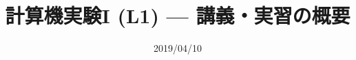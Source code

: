 \documentclass[dvipdfmx]{beamer}
\title{計算機実験I (L1) --- 講義・実習の概要}
\date{2019/04/10}
\begin{document}
\begin{frame}
  \titlepage
  \tableofcontents
\end{frame}





\end{document}
